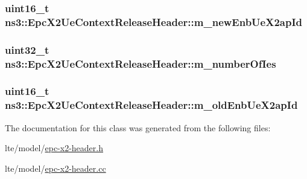 \subsubsection[{\texorpdfstring{m\+\_\+new\+Enb\+Ue\+X2ap\+Id}{m_newEnbUeX2apId}}]{\setlength{\rightskip}{0pt plus 5cm}uint16\+\_\+t ns3\+::\+Epc\+X2\+Ue\+Context\+Release\+Header\+::m\+\_\+new\+Enb\+Ue\+X2ap\+Id\hspace{0.3cm}{\ttfamily [private]}}\hypertarget{classns3_1_1EpcX2UeContextReleaseHeader_a18323d87c655501f5965db0d5fbf4e3c}{}\label{classns3_1_1EpcX2UeContextReleaseHeader_a18323d87c655501f5965db0d5fbf4e3c}
\subsubsection[{\texorpdfstring{m\+\_\+number\+Of\+Ies}{m_numberOfIes}}]{\setlength{\rightskip}{0pt plus 5cm}uint32\+\_\+t ns3\+::\+Epc\+X2\+Ue\+Context\+Release\+Header\+::m\+\_\+number\+Of\+Ies\hspace{0.3cm}{\ttfamily [private]}}\hypertarget{classns3_1_1EpcX2UeContextReleaseHeader_ac7e5438c77474e3504a827fb444a6506}{}\label{classns3_1_1EpcX2UeContextReleaseHeader_ac7e5438c77474e3504a827fb444a6506}
\subsubsection[{\texorpdfstring{m\+\_\+old\+Enb\+Ue\+X2ap\+Id}{m_oldEnbUeX2apId}}]{\setlength{\rightskip}{0pt plus 5cm}uint16\+\_\+t ns3\+::\+Epc\+X2\+Ue\+Context\+Release\+Header\+::m\+\_\+old\+Enb\+Ue\+X2ap\+Id\hspace{0.3cm}{\ttfamily [private]}}\hypertarget{classns3_1_1EpcX2UeContextReleaseHeader_afaa7bb6579bde9595e405ce111b5f8d6}{}\label{classns3_1_1EpcX2UeContextReleaseHeader_afaa7bb6579bde9595e405ce111b5f8d6}


The documentation for this class was generated from the following files\+:\begin{DoxyCompactItemize}
\item 
lte/model/\hyperlink{epc-x2-header_8h}{epc-\/x2-\/header.\+h}\item 
lte/model/\hyperlink{epc-x2-header_8cc}{epc-\/x2-\/header.\+cc}\end{DoxyCompactItemize}
